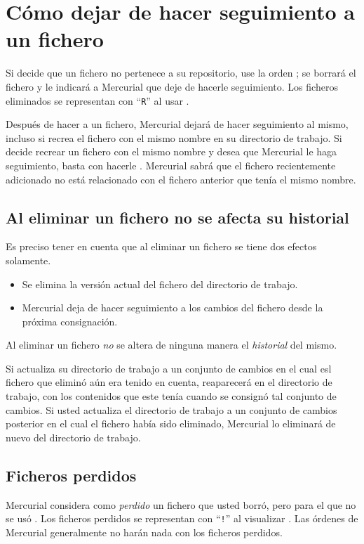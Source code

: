 \section{Cómo dejar de hacer seguimiento a un fichero}

Si decide que un fichero no pertenece a su repositorio, use la orden
; se borrará el fichero y le indicará a Mercurial que
deje de hacerle seguimiento.  Los ficheros eliminados se representan
con ``\texttt{R}'' al usar .

Después de hacer  a un fichero, Mercurial dejará de
hacer seguimiento al mismo, incluso si recrea el fichero con el mismo
nombre en su directorio de trabajo. Si decide recrear un fichero con
el mismo nombre y desea que Mercurial le haga seguimiento, basta con
hacerle . Mercurial sabrá que el fichero recientemente
adicionado no está relacionado con el fichero anterior que tenía el
mismo nombre.

\subsection{Al eliminar un fichero no se afecta su historial}

Es preciso tener en cuenta que al eliminar un fichero se tiene
dos efectos solamente.
\begin{itemize}
\item Se elimina la versión actual del fichero del directorio de 
trabajo.
\item Mercurial deja de hacer seguimiento a los cambios del fichero
  desde la próxima consignación.
\end{itemize}
Al eliminar un fichero \emph{no} se altera de ninguna manera el
\emph{historial} del mismo.

Si actualiza su directorio de trabajo a un conjunto de cambios en el
cual esl fichero que eliminó aún era tenido en cuenta, reaparecerá en
el directorio de trabajo, con los contenidos que este tenía cuando se
consignó tal conjunto de cambios.  Si usted actualiza el directorio de
trabajo a un conjunto de cambios posterior en el cual el fichero había
sido eliminado, Mercurial lo eliminará de nuevo del directorio de
trabajo.

\subsection{Ficheros perdidos}

Mercurial considera como \emph{perdido} un fichero que usted borró,
pero para el que no se usó .  Los ficheros perdidos se
representan con ``\texttt{!}'' al visualizar .
Las órdenes de Mercurial generalmente no harán nada con los ficheros
perdidos.

